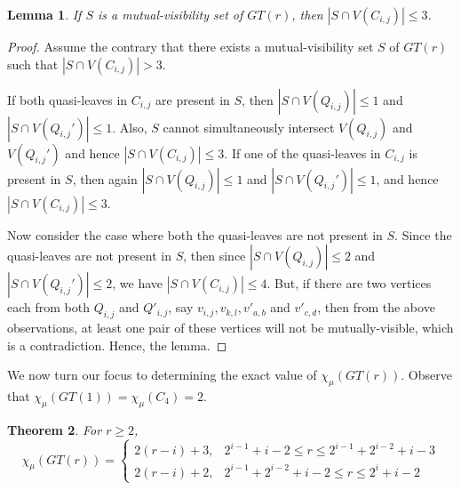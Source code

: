 \documentclass[12pt]{article}
\newtheorem{theorem}{Theorem}[section]
\newtheorem{lemma}[theorem]{Lemma}
\begin{document}
\begin{lemma} \label{lem}
If $S$ is a mutual-visibility set of $GT(r)$, then $|{S \cap V(C_{i,j}) }| \leq 3 $.
\end{lemma}

\begin{proof}
Assume the contrary that there exists a mutual-visibility set $S$ of $GT(r)$ such that $|S \cap V(C_{i,j})| > 3$.\par

If both quasi-leaves in $C_{i,j}$ are present in $S$, then $|S \cap V(Q_{i,j})| \leq 1$ and $|S \cap V(Q_{i,j}')| \leq 1$. Also, $S$ cannot simultaneously intersect $V(Q_{i,j})$ and $V(Q_{i,j}')$ and hence $|S \cap V(C_{i,j})| \leq 3$. If one of the quasi-leaves in $C_{i,j}$ is present in $S$, then again $|S \cap V(Q_{i,j})| \leq 1$ and $|S \cap V(Q_{i,j}')| \leq 1$, and hence $|{S \cap V(C_{i,j}) }| \leq 3$.\par

Now consider the case where both the quasi-leaves are not present in $S$. Since the quasi-leaves are not present in $S$, then since $|S \cap V(Q_{i,j})| \leq 2$ and $|S \cap V(Q_{i,j}')| \leq 2$, we have $|{S \cap V(C_{i,j}) }| \leq 4$. But, if there are two vertices each from both $Q_{i,j}$ and $Q'_{i,j}$, say $v_{i,j}, v_{k,l}, v'_{a,b}$ and $v'_{c,d}$, then from the above observations, at least one pair of these vertices will not be mutually-visible, which is a contradiction. Hence, the lemma.
\end{proof}
We now turn our focus to determining the exact  value of $\chi_{\mu}(GT(r))$. Observe that $\chi_{\mu}(GT(1))=\chi_{\mu}(C_4)=2$. 



\begin{theorem} \label{binary}
For $r \geq 2$,
	$$\chi_\mu(GT(r))=\begin{cases}
        2(r-i) + 3, & 2^{i-1}+i-2 \leq r \leq 2^{i-1}+2^{i-2}+i-3\\
	    2(r-i) + 2, & 2^{i-1}+2^{i-2}+i-2 \leq r \leq 2^i + i - 2       
	\end{cases}$$
\end{theorem} 
    
\end{document}
